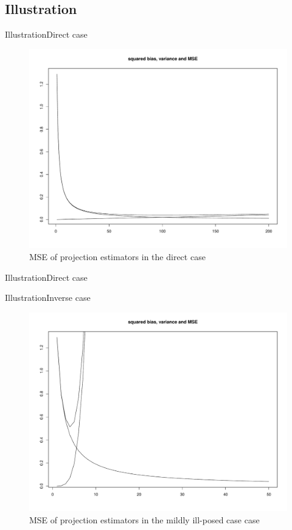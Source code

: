 \documentclass[10pt]{beamer}
\begin{document}
\subsection{Illustration}
\begin{frame}{Illustration}{Direct case}
\begin{figure}
\centering
 \includegraphics[width=.8\linewidth]{direct-case.pdf}
\caption{MSE of projection estimators in the direct case}\label{DC}
\end{figure}
\end{frame}

\begin{frame}{Illustration}{Direct case}
\begin{center}
\end{center}
\end{frame}

\begin{frame}{Illustration}{Inverse case}
\begin{figure}
\centering
 \includegraphics[width=.8\linewidth]{mildly-illposed.pdf}
\caption{MSE of projection estimators in the mildly ill-posed case case}\label{DC}
\end{figure}
\end{frame}
\end{document}

